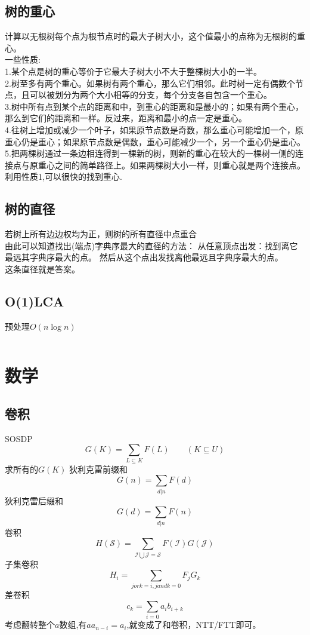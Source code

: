 \documentclass[titlepage, a4paper]{report}
\newcommand{\cppcode}[1]{  
    \inputminted[mathescape]{cpp}{source/#1}  
}
\begin{document}
\section{树的重心}
计算以无根树每个点为根节点时的最大子树大小，这个值最小的点称为无根树的重心。\\
一些性质:\\
1.某个点是树的重心等价于它最大子树大小不大于整棵树大小的一半。\\
2.树至多有两个重心。如果树有两个重心，那么它们相邻。此时树一定有偶数个节点，且可以被划分为两个大小相等的分支，每个分支各自包含一个重心。\\
3.树中所有点到某个点的距离和中，到重心的距离和是最小的；如果有两个重心，那么到它们的距离和一样。反过来，距离和最小的点一定是重心。\\
4.往树上增加或减少一个叶子，如果原节点数是奇数，那么重心可能增加一个，原重心仍是重心；如果原节点数是偶数，重心可能减少一个，另一个重心仍是重心。\\
5.把两棵树通过一条边相连得到一棵新的树，则新的重心在较大的一棵树一侧的连接点与原重心之间的简单路径上。如果两棵树大小一样，则重心就是两个连接点。\\
利用性质1,可以很快的找到重心.

\section{树的直径}
若树上所有边边权均为正，则树的所有直径中点重合\\
由此可以知道找出(端点)字典序最大的直径的方法：
从任意顶点出发：找到离它最远其字典序最大的点。
然后从这个点出发找离他最远且字典序最大的点。\\
这条直径就是答案。


\section{O(1)LCA}
预处理$O(n\log n)$
\cppcode{O1_LCA.cpp}




\chapter{数学}

\section{卷积}
SOSDP\\
$$
G(K)=\sum_{L\subseteq K }F(L)\qquad (K\subseteq U)
$$
求所有的$G(K)$
狄利克雷前缀和\\
$$
G(n)=\sum_{d|n} F(d)
$$
狄利克雷后缀和\\
$$
G(d)=\sum_{d|n} F(n)
$$
卷积\\
$$
H(\mathcal{S})=\sum_{\mathcal{I} \bigcup \mathcal{J}=\mathcal{S}} F(\mathcal{I}) G(\mathcal{J})
$$
子集卷积\\
$$
H_i=\sum_{j or k=i ,j and k=0} F_j G_k
$$
差卷积\\
$$
c_k=\sum_{i=0} a_i b_{i+k}
$$
考虑翻转整个$a$数组,有$aa_{n-i}=a_i$,就变成了和卷积，NTT/FTT即可。
\end{document}

